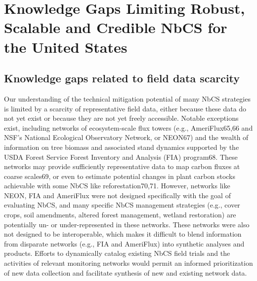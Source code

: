 \documentclass[
  letterpaper,
  DIV=11,
  numbers=noendperiod]{scrreprt}
\begin{document}

\hypertarget{sec-knowledge}{%
\chapter{Knowledge Gaps Limiting Robust, Scalable and Credible NbCS for
the United States}\label{sec-knowledge}}

\hypertarget{sec-data-scarcity}{%
\section{Knowledge gaps related to field data
scarcity}\label{sec-data-scarcity}}

Our understanding of the technical mitigation potential of many NbCS
strategies is limited by a scarcity of representative field data, either
because these data do not yet exist or because they are not yet freely
accessible. Notable exceptions exist, including networks of
ecosystem-scale flux towers (e.g., AmeriFlux65,66 and NSF's National
Ecological Observatory Network, or NEON67) and the wealth of information
on tree biomass and associated stand dynamics supported by the USDA
Forest Service Forest Inventory and Analysis (FIA) program68. These
networks may provide sufficiently representative data to map carbon
fluxes at coarse scales69, or even to estimate potential changes in
plant carbon stocks achievable with some NbCS like reforestation70,71.
However, networks like NEON, FIA and AmeriFlux were not designed
specifically with the goal of evaluating NbCS, and many specific NbCS
management strategies (e.g., cover crops, soil amendments, altered
forest management, wetland restoration) are potentially un- or
under-represented in these networks. These networks were also not
designed to be interoperable, which makes it difficult to blend
information from disparate networks (e.g., FIA and AmeriFlux) into
synthetic analyses and products. Efforts to dynamically catalog existing
NbCS field trials and the activities of relevant monitoring networks
would permit an informed prioritization of new data collection and
facilitate synthesis of new and existing network data.
\end{document}

